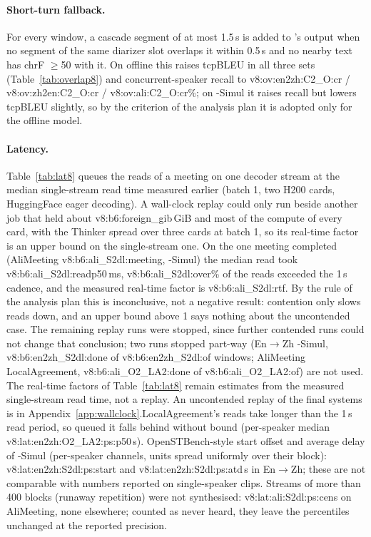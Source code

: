 \paragraph{Short-turn fallback.} For every window, a cascade segment of at most 1.5\,s is added to \sys{}'s output
when no \sys{} segment of the same diarizer slot overlaps it within 0.5\,s and no nearby \sys{} text has chrF $\ge$50 with
it. On offline \sys{} this raises tcpBLEU in all three sets (Table~\ref{tab:overlap8}) and concurrent-speaker recall to
\num{v8:ov:en2zh:C2_O:cr} / \num{v8:ov:zh2en:C2_O:cr} / \num{v8:ov:ali:C2_O:cr}\%; on \sys{}-Simul it raises recall but
lowers tcpBLEU slightly, so by the criterion of the analysis plan it is adopted only for the offline model.

\paragraph{Latency.} Table~\ref{tab:lat8} queues the reads of a meeting on one decoder stream at the median single-stream
read time measured earlier (batch 1, two H200 cards, HuggingFace eager decoding). A wall-clock replay could only run beside another
job that held about \num{v8:b6:foreign_gib}\,GiB and most of the compute of every card,
with the Thinker spread over three cards at batch 1, so its real-time factor is an upper bound on the single-stream one.
On the one meeting completed (AliMeeting \num{v8:b6:ali_S2dl:meeting}, \sys{}-Simul) the median read took
\num{v8:b6:ali_S2dl:readp50}\,ms, \num{v8:b6:ali_S2dl:over}\% of the reads exceeded the 1\,s cadence, and the measured
real-time factor is \num{v8:b6:ali_S2dl:rtf}. By the rule of the analysis plan this is inconclusive, not a negative result:
contention only slows reads down, and an upper bound above 1 says nothing about the uncontended case. The remaining
replay runs were stopped, since further contended runs could not change that conclusion; two runs stopped part-way
(En$\rightarrow$Zh \sys{}-Simul, \num{v8:b6:en2zh_S2dl:done} of \num{v8:b6:en2zh_S2dl:of} windows; AliMeeting LocalAgreement,
\num{v8:b6:ali_O2_LA2:done} of \num{v8:b6:ali_O2_LA2:of}) are not used. The real-time factors of Table~\ref{tab:lat8} remain
estimates from the measured single-stream read time, not a replay.\ifWallclock{} An uncontended replay of the final systems is in Appendix~\ref{app:wallclock}.\fi LocalAgreement's reads take longer than the 1\,s read period, so queued it falls
behind without bound (per-speaker median \num{v8:lat:en2zh:O2_LA2:ps:p50}\,s). OpenSTBench-style start offset and
average delay of \sys{}-Simul (per-speaker channels, units spread uniformly over their block): \num{v8:lat:en2zh:S2dl:ps:start} and
\num{v8:lat:en2zh:S2dl:ps:atd}\,s in En$\rightarrow$Zh; these are not comparable with numbers reported on single-speaker
clips. Streams of more than 400 blocks (runaway repetition) were not synthesised: \num{v8:lat:ali:S2dl:ps:cens} on
AliMeeting, none elsewhere; counted as never heard, they leave the percentiles unchanged at the reported precision.

